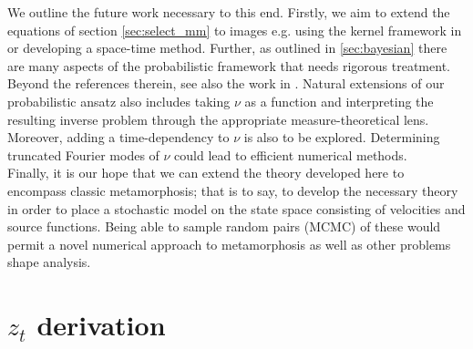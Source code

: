 \documentclass[runningheads]{llncs}
\begin{document}
We outline the future work necessary to this end. Firstly, we aim to extend the
equations of section \ref{sec:select_mm} to images e.g. using the kernel
framework in \cite{richardson2016metamorphosis} or developing a space-time
method. Further, as outlined in \ref{sec:bayesian} there are many aspects of the
probabilistic framework that needs rigorous treatment. Beyond the references
therein, see also the work in \cite{dashti2013map}. Natural extensions of our
probabilistic ansatz also includes taking $\nu$ as a function and interpreting
the resulting inverse problem through the appropriate measure-theoretical lens.
Moreover, adding a time-dependency to $\nu$ is also to be explored. Determining
truncated Fourier modes of $\nu$ could lead to efficient numerical methods.\\

Finally, it is our hope that we can extend the theory developed here to
encompass classic metamorphosis; that is to say, to develop the necessary theory
in order to place a stochastic model on the state space consisting of velocities
and source functions. Being able to sample random pairs (MCMC) of these would
permit a novel numerical approach to metamorphosis as well as other problems
shape analysis.


\appendix \section{$z_t$ derivation}\label{app:z_derivation}
\end{document}
